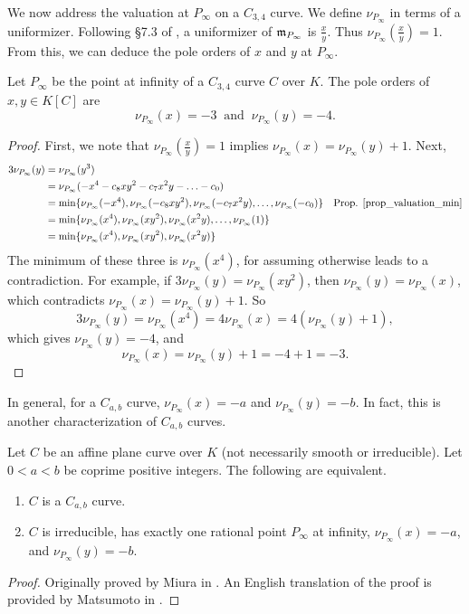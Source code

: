 We now address the valuation at $P_\infty$ on a $C_{3,4}$ curve.
We define $\nu_{P_\infty}$ in terms of a uniformizer.
Following \S 7.3 of \cite{galbraith12}, a uniformizer of $\frak m_{P_\infty}$ is $\frac x y$.
Thus $\nu_{P_\infty}\left(\frac x y\right) = 1$.
From this, we can deduce the pole orders of $x$ and $y$ at $P_\infty$.
\begin{proposition}
  Let $P_\infty$ be the point at infinity of a $C_{3,4}$ curve $C$ over $K$.
  The pole orders of $x,y\in K[C]$ are
  \[ \nu_{P_\infty}(x) = -3 ~\text{ and }~ \nu_{P_\infty}(y) = -4. \]
\end{proposition}
\begin{proof}
  First, we note that $\nu_{P_\infty}\left(\frac x y\right) = 1$ implies $\nu_{P_\infty}(x) = \nu_{P_\infty}(y) + 1$.
  Next,
  \begin{align*}
    3\nu_{P_\infty}(y)
      &= \nu_{P_\infty}(y^3) \\
      &= \nu_{P_\infty}(-x^4 - c_8xy^2 - c_7x^2y - \ldots - c_0) \\
      &= \min\{\nu_{P_\infty}(-x^4), \nu_{P_\infty}(- c_8xy^2), \nu_{P_\infty}(-c_7x^2y), \ldots, \nu_{P_\infty}(-c_0)\}
        & \text{Prop. \ref{prop_valuation_min}} \\
      &= \min\{\nu_{P_\infty}(x^4), \nu_{P_\infty}(xy^2), \nu_{P_\infty}(x^2y), \ldots, \nu_{P_\infty}(1)\} \\
      &= \min\{\nu_{P_\infty}(x^4), \nu_{P_\infty}(xy^2), \nu_{P_\infty}(x^2y)\}
  \end{align*}
  The minimum of these three is $\nu_{P_\infty}(x^4)$, for assuming otherwise leads to a contradiction.
  For example, if $3\nu_{P_\infty}(y) = \nu_{P_\infty}(xy^2)$, then $\nu_{P_\infty}(y) = \nu_{P_\infty}(x)$,
  which contradicts $\nu_{P_\infty}(x) = \nu_{P_\infty}(y) + 1$. So
  \[ 3\nu_{P_\infty}(y) = \nu_{P_\infty}(x^4) = 4\nu_{P_\infty}(x)
     = 4(\nu_{P_\infty}(y) + 1), \]
  which gives $\nu_{P_\infty}(y) = -4$, and
  \[ \nu_{P_\infty}(x) = \nu_{P_\infty}(y) + 1 = -4 + 1 = -3. \]
\end{proof}

In general, for a $C_{a,b}$ curve, $\nu_{P_\infty}(x) = -a$ and $\nu_{P_\infty}(y) = -b$.
In fact, this is another characterization of $C_{a,b}$ curves.
\begin{theorem}
  Let $C$ be an affine plane curve over $K$ (not necessarily smooth or irreducible).
  Let $0 < a < b$ be coprime positive integers.
  The following are equivalent.
  \begin{enumerate}[label=(\roman*)]
    \item $C$ is a $C_{a,b}$ curve.
    \item $C$ is irreducible, has exactly one rational point $P_\infty$ at infinity,
          $\nu_{P_\infty}(x) = -a$, and
          $\nu_{P_\infty}(y) = -b$.
  \end{enumerate}
\end{theorem}
\begin{proof}
  Originally proved by Miura in \cite{miura97}.
  An English translation of the proof is provided by Matsumoto in \cite{matsumoto98}.
\end{proof}




